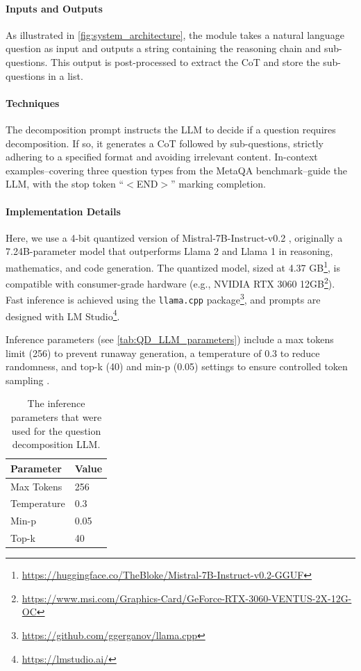 \documentclass[pdflatex,sn-mathphys-num]{sn-jnl}%
\theoremstyle{thmstyleone}%
\theoremstyle{thmstyletwo}%
\theoremstyle{thmstylethree}%
\begin{document}
\paragraph{Inputs and Outputs}  
As illustrated in \autoref{fig:system_architecture}, the module takes a natural language question as input and outputs a string containing the reasoning chain and sub-questions. This output is post-processed to extract the CoT and store the sub-questions in a list.

\paragraph{Techniques}  
The decomposition prompt instructs the LLM to decide if a question requires decomposition. If so, it generates a CoT followed by sub-questions, strictly adhering to a specified format and avoiding irrelevant content. In-context examples--covering three question types from the MetaQA benchmark--guide the LLM, with the stop token ``$<$END$>$'' marking completion.

\paragraph{Implementation Details}  
Here, we use a 4-bit quantized version of Mistral-7B-Instruct-v0.2 \cite{Touvron2023, Jiang2023}, originally a 7.24B-parameter model that outperforms Llama 2 and Llama 1 in reasoning, mathematics, and code generation. The quantized model, sized at 4.37 GB\footnote{\url{https://huggingface.co/TheBloke/Mistral-7B-Instruct-v0.2-GGUF}}, is compatible with consumer-grade hardware (e.g., NVIDIA RTX 3060 12GB\footnote{\url{https://www.msi.com/Graphics-Card/GeForce-RTX-3060-VENTUS-2X-12G-OC}}). Fast inference is achieved using the \texttt{llama.cpp} package\footnote{\url{https://github.com/ggerganov/llama.cpp}}, and prompts are designed with LM Studio\footnote{\url{https://lmstudio.ai/}}.

Inference parameters (see \autoref{tab:QD_LLM_parameters}) include a max tokens limit (256) to prevent runaway generation, a temperature of 0.3 to reduce randomness, and top-k (40) and min-p (0.05) settings to ensure controlled token sampling \cite{min_p}.

\begin{table}[h!]
\centering
\caption{The inference parameters that were used for the question decomposition LLM.}
\label{tab:QD_LLM_parameters}
\begin{tabular}{l|l}
\textbf{Parameter} & \textbf{Value} \\ \hline
Max Tokens         & 256            \\
Temperature        & 0.3            \\
Min-p              & 0.05           \\
Top-k              & 40            
\end{tabular}
\end{table}
\end{document}
